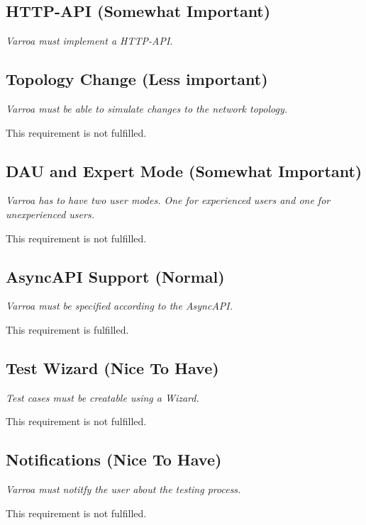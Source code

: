 \subsection{HTTP-API (Somewhat Important)}
\emph{Varroa must implement a HTTP-API.}


\subsection{Topology Change (Less important)}
\emph{Varroa must be able to simulate changes to the network topology.}

This requirement is not fulfilled.

\subsection{DAU and Expert Mode (Somewhat Important)}
\emph{Varroa has to have two user modes.
One for experienced users and one for unexperienced users.}

This requirement is not fulfilled.

\subsection{AsyncAPI Support (Normal)}
\emph{Varroa must be specified according to the AsyncAPI.}

This requirement is fulfilled.

\subsection{Test Wizard (Nice To Have)}
\emph{Test cases must be creatable using a Wizard.}

This requirement is not fulfilled.

\subsection{Notifications (Nice To Have)}
\emph{Varroa must notitfy the user about the testing process.}

This requirement is not fulfilled.


















